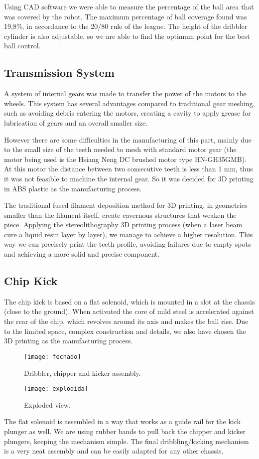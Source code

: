 Using CAD software we were able to measure the percentage of the ball area that
was covered by the robot. The maximum percentage of ball coverage found was
19,8\%, in accordance to the 20/80 rule of the league. The height of the
dribbler cylinder is also adjustable, so we are able to find the optimum point
for the best ball control.


\subsection{Transmission System}

A system of internal gears was made to transfer the power of the motors to the
wheels. This system has several advantages compared to traditional gear
meshing, such as avoiding debris entering the motors, creating a cavity to
apply grease for lubrication of gears and an overall smaller size.

However there are some difficulties in the manufacturing of this part, mainly
due to the small size of the teeth needed to mesh with standard motor gear (the
motor being used is the Hsiang Neng DC brushed motor type HN-GH35GMB). At this
motor the distance between two consecutive teeth is less than 1 mm, thus it was
not feasible to machine the internal gear. So it was decided for 3D printing in
ABS plastic as the manufacturing process.

The traditional fused filament deposition method for 3D printing, in geometries
smaller than the filament itself, create cavernous structures that weaken the
piece. Applying the stereolithography 3D printing process (when a laser beam
cure a liquid resin layer by layer), we manage to achieve a higher resolution.
This way we can precisely print the teeth profile, avoiding failures due to
empty spots and achieving a more solid and precise component.


\subsection{Chip Kick}

The chip kick is based on a flat solenoid, which is mounted in a slot at the
chassis (close to the ground). When activated the core of mild steel is
accelerated against the rear of the chip, which revolves around its axis and
makes the ball rise. Due to the limited space, complex construction and
details, we also have chosen the 3D printing as the manufacturing process.


\begin{figure}[tbph]
    \centering
    \texttt{[image: fechado]}
    \caption{Dribbler, chipper and kicker assembly.}
    \label{fig:fechado}

    \texttt{[image: explodida]}
    \caption{Exploded view.}
    \label{fig:explodida}
\end{figure}

The flat solenoid is assembled in a way that works as a guide rail for the kick
plunger as well. We are using rubber bands to pull back the chipper and kicker
plungers, keeping the mechanism simple. The final dribbling/kicking mechanism
is a very neat assembly and can be easily adapted for any other chassis.

